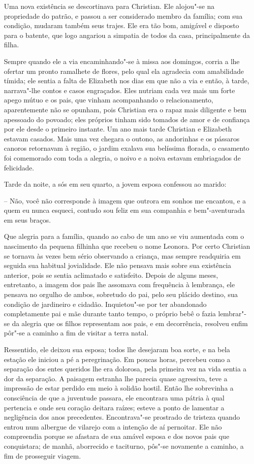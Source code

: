 Uma nova existência se descortinava para Christian. Ele alojou"-se na
propriedade do patrão, e passou a ser considerado membro da família;
com sua condição, mudaram também seus trajes. Ele era tão bom, amigável
e disposto para o batente, que logo angariou a simpatia de todos da
casa, principalmente da filha.

Sempre quando ele a via encaminhando"-se à missa aos domingos, corria a
lhe ofertar um pronto ramalhete de flores, pelo qual ela agradecia com
amabilidade tímida; ele sentia a falta de Elizabeth nos dias em que não
a via e então, à tarde, narrava"-lhe contos e casos engraçados. Eles
nutriam cada vez mais um forte apego mútuo e os pais, que vinham
acompanhando o relacionamento, aparentemente não se opunham, pois
Christian era o rapaz mais diligente e bem apessoado do povoado; eles
próprios tinham sido tomados de amor e de confiança por ele desde
o primeiro instante. Um ano mais tarde Christian e Elizabeth estavam
casados. Mais uma vez chegara o outono, as andorinhas e os pássaros
canoros retornavam à região, o jardim exalava sua belíssima florada, o
casamento foi comemorado com toda a alegria, o noivo e a noiva estavam
embriagados de felicidade.

Tarde da noite, a sós em seu quarto, a jovem esposa confessou ao marido:

-- Não, você não corresponde à imagem que outrora em sonhos me
encantou, e a quem eu nunca esqueci, contudo sou feliz em sua companhia
e bem"-aventurada em seus braços.

Que alegria para a família, quando ao cabo de um ano se viu aumentada
com o nascimento da pequena filhinha que recebeu o nome Leonora. Por
certo Christian se tornava às vezes bem sério observando a criança, mas
sempre readquiria em seguida sua habitual jovialidade. Ele não pensava
mais sobre sua existência anterior, pois se sentia aclimatado e
satisfeito. Depois de alguns meses, entretanto, a imagem dos pais lhe
assomava com frequência à lembrança, ele pensava no orgulho de ambos,
sobretudo do pai, pelo seu plácido destino, sua condição de jardineiro
e cidadão. Inquietou"-se por ter abandonado completamente pai e mãe
durante tanto tempo, o próprio bebê o fazia lembrar"-se da alegria que
os filhos representam aos pais, e em decorrência, resolveu enfim pôr"-se
a caminho a fim de visitar a terra natal.

Ressentido, ele deixou sua esposa; todos lhe desejaram boa sorte, e na
bela estação ele iniciou a pé a peregrinação. Em poucas horas, percebeu
como a separação dos entes queridos lhe era dolorosa, pela primeira vez
na vida sentia a dor da separação. A paisagem estranha lhe parecia
quase agressiva, teve a impressão de estar perdido em meio à solidão
hostil. Então lhe sobrevinha a consciência de que a juventude passara,
ele encontrara uma pátria à qual pertencia e onde seu coração deitara
raízes; esteve a ponto de lamentar a negligência dos anos precedentes.
Encontrava"-se prostrado de tristeza quando entrou num albergue de
vilarejo com a intenção de aí pernoitar. Ele não compreendia porque se
afastara de sua amável esposa e dos novos pais que conquistara; de
manhã, aborrecido e taciturno, pôs"-se novamente a caminho, a fim de
prosseguir viagem.

